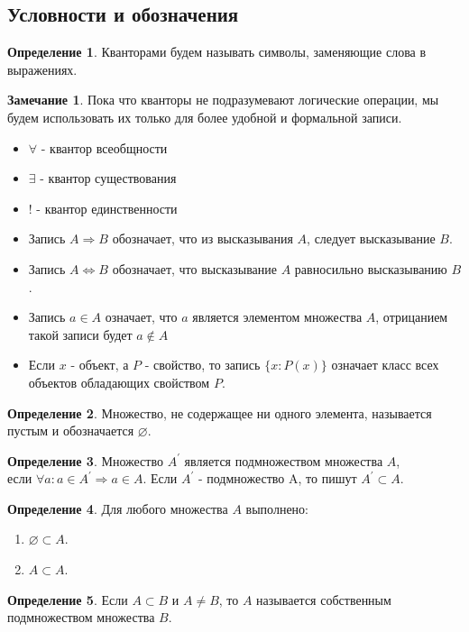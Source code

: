 \documentclass[a4paper, 12pt]{article}
\newcommand{\lra}{\Leftrightarrow}
\renewcommand{\emptyset}{\varnothing}
\theoremstyle{definition}
\newtheorem*{definition}{Определение}
\newtheorem*{comm}{Замечание}
\begin{document}
    \subsection{Условности и обозначения}
        \begin{definition}
            Кванторами будем называть символы, заменяющие слова в выражениях.
        \end{definition}
        \begin{comm}
            Пока что кванторы не подразумевают логические операции, мы будем использовать их только для более удобной и формальной записи.
        \end{comm}
        \begin{itemize}
            \item $\forall$ - квантор всеобщности
            \item $\exists$ - квантор существования
            \item $!$ - квантор единственности
            \item Запись $A \Rightarrow B$ обозначает, что из высказывания $A$, следует высказывание $B$. 
            \item Запись $A \lra B$ обозначает, что высказывание $A$ равносильно высказыванию $B$.
            \item Запись $a \in A$ означает, что $a$ является элементом множества $A$, отрицанием такой записи будет $a \notin A$
            \item Если $x$ - объект, а $P$ - свойство, то запись $\{x : P(x)\}$ означает класс всех объектов обладающих свойством $P$.
        \end{itemize}
        \begin{definition}
            Множество, не содержащее ни одного элемента, называется пустым и обозначается $\emptyset$.
        \end{definition}
        \begin{definition}
            Множество $A^{\prime}$ является подмножеством множества $A$, \\ если $\forall a: a\in A^{\prime}\Rightarrow a\in A$. Если $A^{\prime}$ - подмножество A, то пишут $A^{\prime}\subset A$.
        \end{definition}        
        \begin{definition}
            Для любого множества $A$ выполнено:
            \begin{enumerate}
                \item $\emptyset \subset A$.
                \item $A \subset A$.
            \end{enumerate}
        \end{definition}
        \begin{definition}
            Если $A\subset B$ и $A\ne B$, то $A$ называется собственным подмножеством множества $B$.
        \end{definition}
\end{document}
